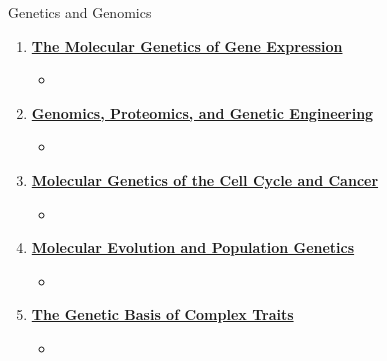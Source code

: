 \documentclass[12pt,letterpaper]{article}
\begin{document}
\begin{chapbox}{Genetics and Genomics}
{\begin{enumerate}[font=\bfseries, wide]
\begin{itemize}
    \end{itemize}
    \item \hyperlink{8}{\textbf{The Molecular Genetics of Gene Expression}}
    \begin{itemize}
        \item 
    \end{itemize}
    \item \hyperlink{10}{\textbf{Genomics, Proteomics, and Genetic Engineering}}
    \begin{itemize}
        \item 
    \end{itemize}
    \item \hyperlink{13}{\textbf{Molecular Genetics of the Cell Cycle and Cancer}}
    \begin{itemize}
        \item 
    \end{itemize}    
    \item \hyperlink{14}{\textbf{Molecular Evolution and Population Genetics}}
    \begin{itemize}
        \item 
    \end{itemize}
    \item \hyperlink{15}{\textbf{The Genetic Basis of Complex Traits}}
    \begin{itemize}
        \item 
    \end{itemize}
\end{enumerate}
}\end{chapbox}



\end{document}
